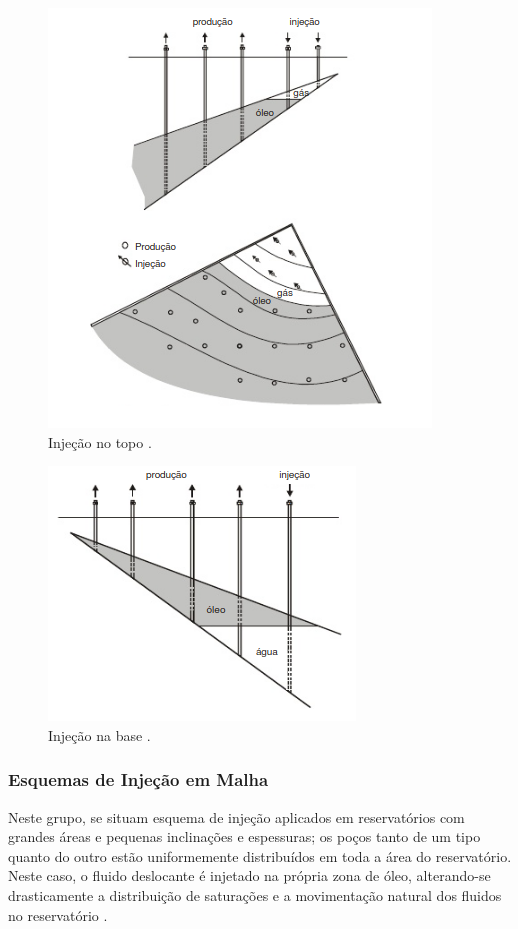 \begin{figure}[!ht]
\centering
\includegraphics[width=.6\textwidth]{figs/revisao/revisao_injtop.png}
\caption{Injeção no topo \cite[p. 566]{engres}.}
\label{fig:rev_injtop}
\end{figure}

\begin{figure}[!ht]
\centering
\includegraphics[width=.6\textwidth]{figs/revisao/revisao_injbas.png}
\caption{Injeção na base \cite[p. 566]{engres}.}
\label{fig:rev_injbas}
\end{figure}





\subsubsection{Esquemas de Injeção em Malha}
Neste grupo, se situam esquema de injeção aplicados em reservatórios com grandes áreas e pequenas inclinações e espessuras; os poços tanto de um tipo quanto do outro estão uniformemente distribuídos em toda a área do reservatório. Neste caso, o fluido deslocante é injetado na própria zona de óleo, alterando-se drasticamente a distribuição de saturações e a movimentação natural dos fluidos no reservatório \cite[p. 567]{engres}.

